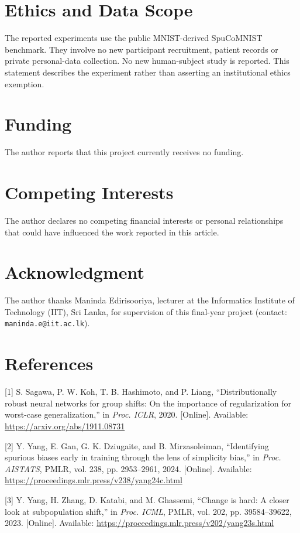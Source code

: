 \section*{Ethics and Data Scope}
The reported experiments use the public MNIST-derived SpuCoMNIST benchmark. They involve no new participant recruitment, patient records or private personal-data collection. No new human-subject study is reported. This statement describes the experiment rather than asserting an institutional ethics exemption.

\section*{Funding}
The author reports that this project currently receives no funding.

\section*{Competing Interests}
The author declares no competing financial interests or personal relationships that could have influenced the work reported in this article.

\section*{Acknowledgment}
The author thanks Maninda Edirisooriya, lecturer at the Informatics Institute of Technology (IIT), Sri Lanka, for supervision of this final-year project (contact: \texttt{maninda.e@iit.ac.lk}).

\section*{References}


[1]  S. Sagawa, P. W. Koh, T. B. Hashimoto, and P. Liang, ``Distributionally robust neural networks for group shifts: On the importance of regularization for worst-case generalization,'' in \emph{Proc. ICLR}, 2020. [Online]. Available: \url{https://arxiv.org/abs/1911.08731}

[2]  Y. Yang, E. Gan, G. K. Dziugaite, and B. Mirzasoleiman, ``Identifying spurious biases early in training through the lens of simplicity bias,'' in \emph{Proc. AISTATS}, PMLR, vol. 238, pp. 2953--2961, 2024. [Online]. Available: \url{https://proceedings.mlr.press/v238/yang24c.html}

[3]  Y. Yang, H. Zhang, D. Katabi, and M. Ghassemi, ``Change is hard: A closer look at subpopulation shift,'' in \emph{Proc. ICML}, PMLR, vol. 202, pp. 39584--39622, 2023. [Online]. Available: \url{https://proceedings.mlr.press/v202/yang23s.html}

